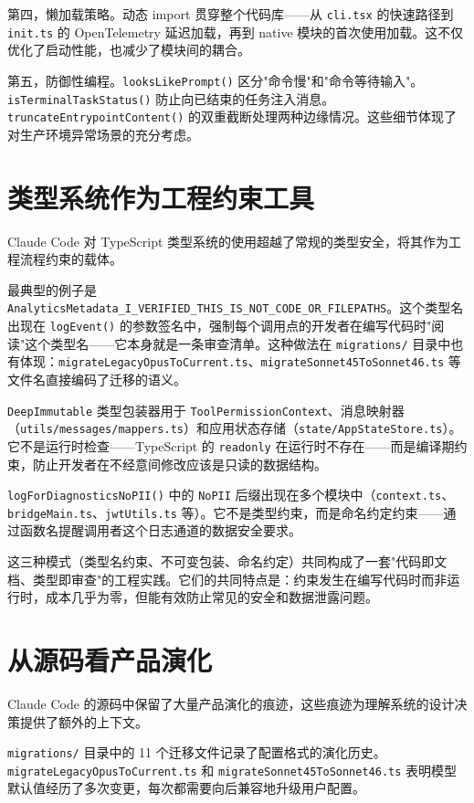 第四，懒加载策略。动态 import 贯穿整个代码库——从 \texttt{cli.tsx} 的快速路径到 \texttt{init.ts} 的 OpenTelemetry 延迟加载，再到 native 模块的首次使用加载。这不仅优化了启动性能，也减少了模块间的耦合。

第五，防御性编程。\texttt{looksLikePrompt()} 区分"命令慢"和"命令等待输入"。\texttt{isTerminalTaskStatus()} 防止向已结束的任务注入消息。\texttt{truncateEntrypointContent()} 的双重截断处理两种边缘情况。这些细节体现了对生产环境异常场景的充分考虑。

\section{类型系统作为工程约束工具}

Claude Code 对 TypeScript 类型系统的使用超越了常规的类型安全，将其作为工程流程约束的载体。

最典型的例子是 \texttt{AnalyticsMetadata\_I\_VERIFIED\_THIS\_IS\_NOT\_CODE\_OR\_FILEPATHS}。这个类型名出现在 \texttt{logEvent()} 的参数签名中，强制每个调用点的开发者在编写代码时"阅读"这个类型名——它本身就是一条审查清单。这种做法在 \texttt{migrations/} 目录中也有体现：\texttt{migrateLegacyOpusToCurrent.ts}、\texttt{migrateSonnet45ToSonnet46.ts} 等文件名直接编码了迁移的语义。

\texttt{DeepImmutable} 类型包装器用于 \texttt{ToolPermissionContext}、消息映射器（\texttt{utils/messages/mappers.ts}）和应用状态存储（\texttt{state/AppStateStore.ts}）。它不是运行时检查——TypeScript 的 \texttt{readonly} 在运行时不存在——而是编译期约束，防止开发者在不经意间修改应该是只读的数据结构。

\texttt{logForDiagnosticsNoPII()} 中的 \texttt{NoPII} 后缀出现在多个模块中（\texttt{context.ts}、\texttt{bridgeMain.ts}、\texttt{jwtUtils.ts} 等）。它不是类型约束，而是命名约定约束——通过函数名提醒调用者这个日志通道的数据安全要求。

这三种模式（类型名约束、不可变包装、命名约定）共同构成了一套"代码即文档、类型即审查"的工程实践。它们的共同特点是：约束发生在编写代码时而非运行时，成本几乎为零，但能有效防止常见的安全和数据泄露问题。

\section{从源码看产品演化}

Claude Code 的源码中保留了大量产品演化的痕迹，这些痕迹为理解系统的设计决策提供了额外的上下文。

\texttt{migrations/} 目录中的 11 个迁移文件记录了配置格式的演化历史。\texttt{migrateLegacyOpusToCurrent.ts} 和 \texttt{migrateSonnet45ToSonnet46.ts} 表明模型默认值经历了多次变更，每次都需要向后兼容地升级用户配置。

